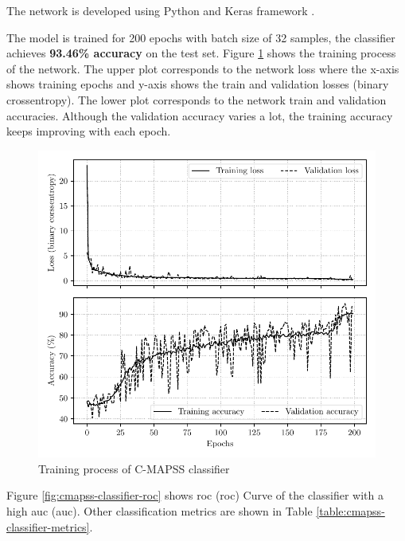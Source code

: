 The network is developed using Python and Keras framework \cite{chollet2015keras}.

The model is trained for 200 epochs with batch size of 32 samples, the classifier achieves \textbf{93.46\% accuracy} on the test set. Figure \ref{fig:cmapss-classifier-training} shows the training process of the network. The upper plot corresponds to the network loss where the x-axis shows training epochs and y-axis shows the train and validation losses (binary crossentropy). The lower plot corresponds to the network train and validation accuracies. Although the validation accuracy varies a lot, the training accuracy keeps improving with each epoch.

\begin{figure}[H]
    \centering
    \includegraphics{figures/cmapss_classification_training.pdf}
    \caption{Training process of C-MAPSS classifier}
    \label{fig:cmapss-classifier-training}
\end{figure}

Figure \ref{fig:cmapss-classifier-roc} shows \acrlong{roc} (\acrshort{roc}) Curve of the classifier with a high \acrlong{auc} (\acrshort{auc}). Other classification metrics are shown in Table \ref{table:cmapss-classifier-metrics}.

